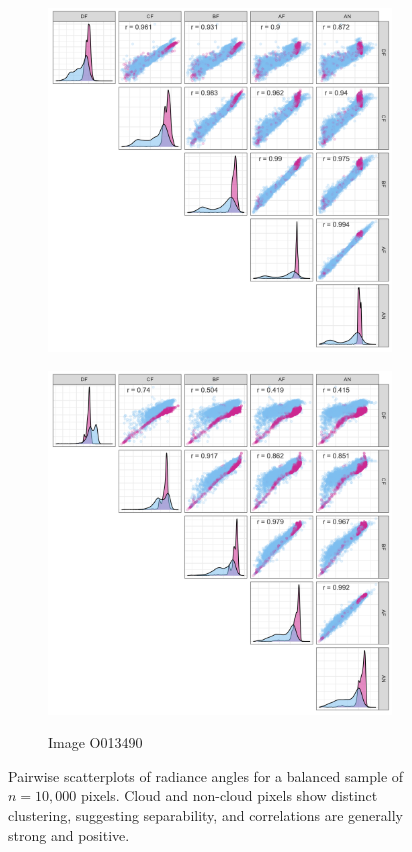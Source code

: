 \documentclass[10pt,letterpaper]{article}
\begin{document}
\begin{figure}[ht]
\begin{subfigure}[t]{0.3\textwidth}
        \includegraphics[width=\textwidth]{figs/corr2_void.png}
        \label{subfig:corr2}
    \end{subfigure}
    \hfill
    \begin{subfigure}[t]{0.3\textwidth}
        \centering
        \caption{Image O013490}
        \includegraphics[width=\textwidth]{figs/corr3_void.png}
        \label{subfig:corr3}
    \end{subfigure}
    \caption{Pairwise scatterplots of radiance angles for a balanced sample of $n=10,000$ pixels. Cloud and non-cloud pixels show distinct clustering, suggesting separability, and correlations are generally strong and positive.}
    \label{fig:corr_combined}
\end{figure}
\end{document}
